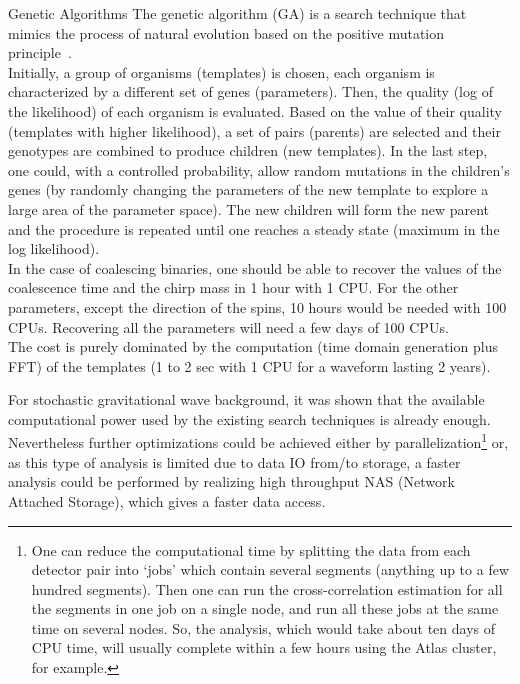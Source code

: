 {Genetic Algorithms}
{The genetic algorithm (GA) is a search technique that mimics the process of 
natural evolution based on 
the positive mutation principle~\cite{PETITEAU2010}.
\\[5pt]
Initially, a group of organisms (templates) is chosen, each organism is 
characterized by a different 
set of genes (parameters). Then, the quality (log of the likelihood) of each 
organism is evaluated. 
Based on the value of their quality (templates with higher likelihood), a set 
of pairs (parents) are 
selected and their genotypes are combined to produce  children (new templates). 
In the last step, one 
could, with a controlled probability, allow random mutations in the children's 
genes (by randomly 
changing the parameters of the new template to explore a large area of the 
parameter space). 
The new children will form the new parent and the procedure is repeated until 
one reaches a steady state (maximum in the log likelihood).
\\[5pt]
In the case of coalescing binaries, one should be able to recover the 
values of the coalescence time and the chirp mass in 1 hour with 1 CPU. 
For the other parameters, except the direction of the spins, 10 hours would 
be needed with 100 CPUs.  Recovering all the parameters will need a few days 
of 100 CPUs.
\\[5pt]
The cost is purely dominated by the computation (time domain generation
plus FFT) of the templates (1 to 2 sec with 1 CPU for a waveform lasting 
2 years).
}

For stochastic gravitational wave background, it was shown that the available 
computational power used by the existing search techniques is already enough. 
Nevertheless further optimizations could be achieved either by 
parallelization\footnote{One can reduce the computational time by 
splitting the data from each 
detector pair into `jobs' which contain several segments (anything up to a few 
hundred segments).  Then one can run the cross-correlation estimation for all the 
segments in one job on a single node, and run all these jobs at the same time on
several nodes.  So, the analysis, which would take about ten days of CPU time, will usually 
complete within a few hours using  the Atlas cluster, for example.} or, as this type 
of analysis is limited due to data IO from/to storage, a faster analysis could 
be performed by realizing high throughput NAS (Network Attached Storage), 
which gives a faster data access.


